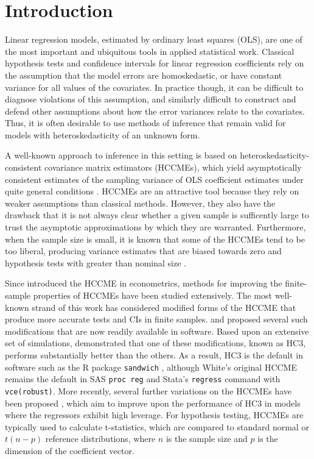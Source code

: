 \documentclass[12pt]{article}\usepackage[]{graphicx}\usepackage[]{color}
\begin{document}
\section{Introduction}
\label{sec:intro}

Linear regression models, estimated by ordinary least squares (OLS), are one of the most important and ubiquitous tools in applied statistical work.
Classical hypothesis tests and confidence intervals for linear regression coefficients rely on the assumption that the model errors are homoskedastic, or have constant variance for all values of the covariates. 
In practice though, it can be difficult to diagnose violations of this assumption, and similarly difficult to construct and defend other assumptions about how the error variances relate to the covariates. 
Thus, it is often desirable to use methods of inference that remain valid for models with heteroskedasticity of an unknown form.

A well-known approach to inference in this setting is based on heteroskedasticity-consistent covariance matrix estimators (HCCMEs), which yield asymptotically consistent estimates of the sampling variance of OLS coefficient estimates under quite general conditions \citep{Huber1967behavior, Eicker1967limit, White1980heteroskedasticity}. 
HCCMEs are an attractive tool because they rely on weaker assumptions than classical methods. 
However, they also have the drawback that it is not always clear whether a given sample is sufficently large to trust the asymptotic approximations by which they are warranted. 
Furthermore, when the sample size is small, it is known that some of the HCCMEs tend to be too liberal, producing variance estimates that are biased towards zero and hypothesis tests with greater than nominal size \citep{Long2000using}. 

Since \citet{White1980heteroskedasticity} introduced the HCCME in econometrics, methods for improving the finite-sample properties of HCCMEs have been studied extensively.  
The most well-known strand of this work has considered modified forms of the HCCME that produce more accurate tests and CIs in finite samples. \citet{MacKinnon1985some} and \citet{Davidson1993estimation} proposed several such modifications that are now readily available in software. 
Based upon an extensive set of simulations, \citet{Long2000using} demonstrated that one of these modifications, known as HC3, performs substantially better than the others.
As a result, HC3 is the default in software such as the R package \texttt{sandwich} \citep{Zeileis2004econometric}, although White's original HCCME remains the default in SAS \texttt{proc reg} and Stata's \texttt{regress} command with \texttt{vce(robust)}. 
More recently, several further variations on the HCCMEs have been proposed \citep{Cribari-Neto2004asymptotic, Cribari-Neto2007inference, Cribari-Neto2011new}, which aim to improve upon the performance of HC3 in models where the regressors exhibit high leverage. 
For hypothesis testing, HCCMEs are typically used to calculate t-statistics, which are compared to standard normal or $t(n - p)$ reference distributions, where $n$ is the sample size and $p$ is the dimension of the coefficient vector.
\end{document}
